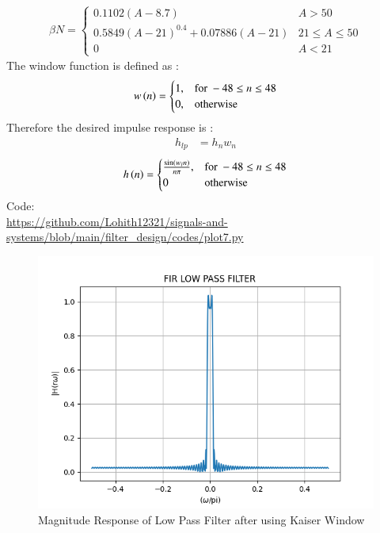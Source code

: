 \documentclass{article}
\begin{document}
\begin{enumerate}
\begin{align}
    \beta N = \left\{ \begin{array}{ll} 0.1102(A-8.7) & A > 50 \\
0.5849(A-21)^{0.4}+ 0.07886(A-21) & 21 \leq A \leq 50 \\
0 & A < 21\end{array} \right.
\end{align}
The window function is defined as :
\begin{align}
    w\left(n\right) = 
\begin{cases} 
    1, & \text{for } -48\leq n \leq 48 \\
    0, & \text{otherwise } 
\end{cases} \label{eq:w(n)_for_Kaiser}
\end{align}
Therefore the desired impulse response is :
\begin{align}
    h_{lp} &= h_{n}w_{n}
\end{align}
\begin{align}
    h\left(n\right) = 
\begin{cases} 
    \frac{\sin(w_l n)}{n\pi},  & \text{for } -48\leq n \leq 48 \\
    0 &\text{otherwise}
\end{cases} \label{eq:h(n)-desired_for_LPF}
\end{align}
Code:\\
\href{https://github.com/Lohith12321/signals-and-systems/blob/main/filter_design/codes/plot7.py}{https://github.com/Lohith12321/signals-and-systems/blob/main/filter_design/codes/plot7.py}
\begin{figure}[H]
\centering
\includegraphics[width=1\columnwidth]{figs/plot7.png}
\caption{Magnitude Response of Low Pass Filter after using Kaiser Window}
\label{fig:Kaiser_LPF_response}
\end{figure}
\end{enumerate}
\end{document}
